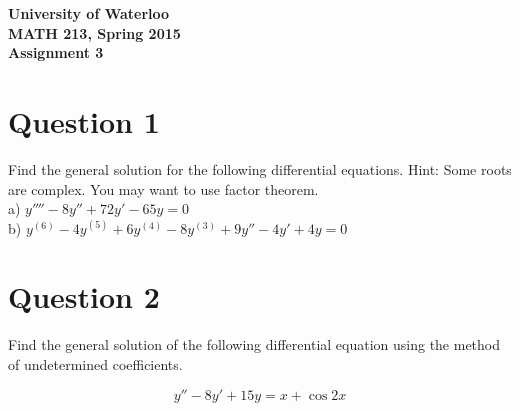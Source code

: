 \documentclass[12pt]{article}
\begin{document}
\begin{center}
{\Large\bf University of Waterloo}\\
\vspace{3mm}
{\Large\bf MATH 213, Spring 2015}\\
\vspace{2mm}
{\Large\bf Assignment 3}\\
\end{center}

\section*{Question 1}

Find the general solution for the following differential equations. Hint: Some roots are complex. You may want to use factor theorem. \\

\noindent
a) $y'''' - 8y'' + 72y' - 65y = 0$ \\
b) $y^{(6)} - 4y^{(5)} + 6y^{(4)} - 8y^{(3)} + 9y'' - 4y' + 4y = 0$

\section*{Question 2}

Find the general solution of the following differential equation using the method of undetermined coefficients.

$$y'' - 8y' + 15y = x + \cos 2x$$
\end{document}
